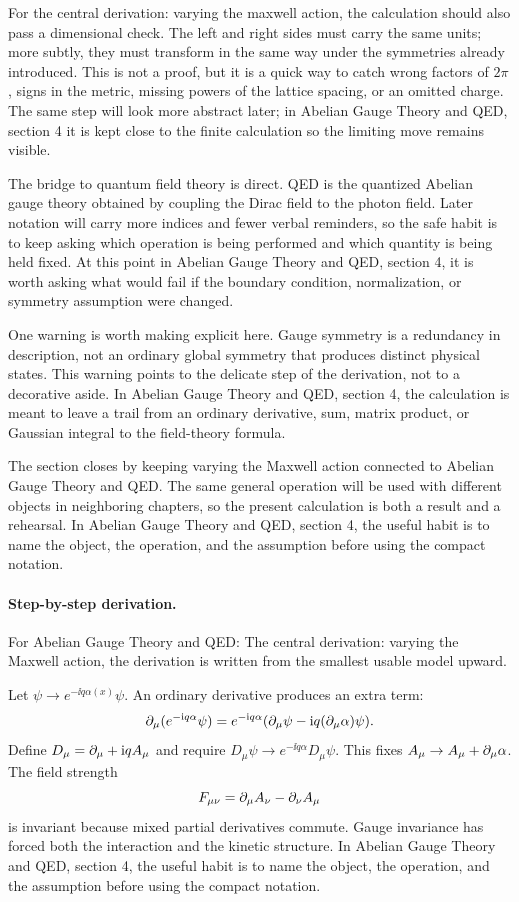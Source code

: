 For the central derivation: varying the maxwell action, the calculation should also pass a dimensional check.  The left and right sides must carry the same units; more subtly, they must transform in the same way under the symmetries already introduced.  This is not a proof, but it is a quick way to catch wrong factors of \(2\pi\), signs in the metric, missing powers of the lattice spacing, or an omitted charge.  The same step will look more abstract later; in Abelian Gauge Theory and QED, section 4 it is kept close to the finite calculation so the limiting move remains visible.

The bridge to quantum field theory is direct.  QED is the quantized Abelian gauge theory obtained by coupling the Dirac field to the photon field.  Later notation will carry more indices and fewer verbal reminders, so the safe habit is to keep asking which operation is being performed and which quantity is being held fixed.  At this point in Abelian Gauge Theory and QED, section 4, it is worth asking what would fail if the boundary condition, normalization, or symmetry assumption were changed.

One warning is worth making explicit here.  Gauge symmetry is a redundancy in description, not an ordinary global symmetry that produces distinct physical states.  This warning points to the delicate step of the derivation, not to a decorative aside.  In Abelian Gauge Theory and QED, section 4, the calculation is meant to leave a trail from an ordinary derivative, sum, matrix product, or Gaussian integral to the field-theory formula.

The section closes by keeping varying the Maxwell action connected to Abelian Gauge Theory and QED.  The same general operation will be used with different objects in neighboring chapters, so the present calculation is both a result and a rehearsal.  In Abelian Gauge Theory and QED, section 4, the useful habit is to name the object, the operation, and the assumption before using the compact notation.



\paragraph{Step-by-step derivation.}

For Abelian Gauge Theory and QED: The central derivation: varying the Maxwell action, the derivation is written from the smallest usable model upward.

Let \(\psi\to e^{-\ii q\alpha(x)}\psi\).  An ordinary derivative produces an extra term:
\[
  \partial_\mu(e^{-\mathrm i q\alpha}\psi)
  =
  e^{-\mathrm i q\alpha}(\partial_\mu\psi-\mathrm i q(\partial_\mu\alpha)\psi).
\]
Define \(D_\mu=\partial_\mu+\mathrm i qA_\mu\) and require \(D_\mu\psi\to e^{-\ii q\alpha}D_\mu\psi\).  This fixes \(A_\mu\to A_\mu+\partial_\mu\alpha\).  The field strength
\[
  F_{\mu\nu}=\partial_\mu A_\nu-\partial_\nu A_\mu
\]
is invariant because mixed partial derivatives commute.  Gauge invariance has forced both the interaction and the kinetic structure.  In Abelian Gauge Theory and QED, section 4, the useful habit is to name the object, the operation, and the assumption before using the compact notation.

